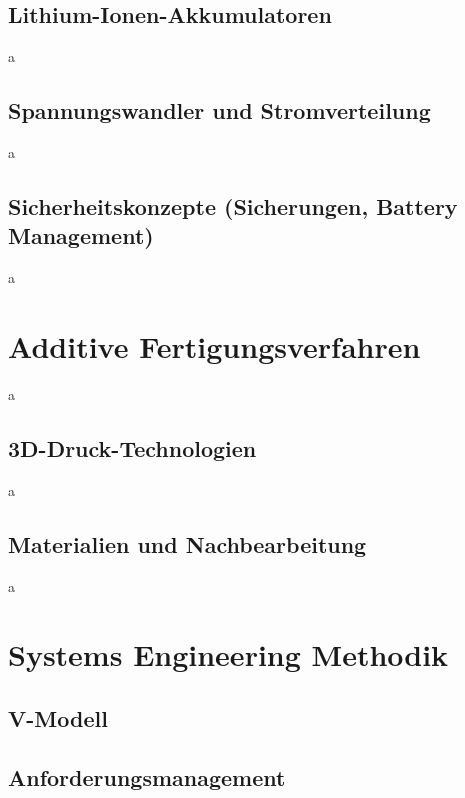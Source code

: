 \subsection{Lithium-Ionen-Akkumulatoren}
a
\subsection{Spannungswandler und Stromverteilung}
a
\subsection{Sicherheitskonzepte (Sicherungen, Battery Management)}
a

\section{Additive Fertigungsverfahren}
a
\subsection{3D-Druck-Technologien}
a
\subsection{Materialien und Nachbearbeitung}
a

\section{Systems Engineering Methodik}
\subsection{V-Modell}
\subsection{Anforderungsmanagement}




%
%
